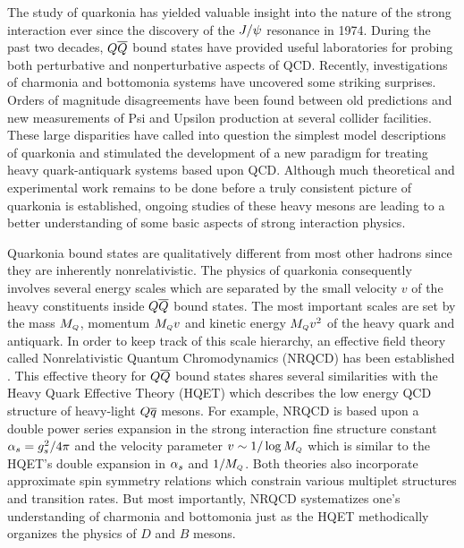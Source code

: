 

	The study of quarkonia has yielded valuable insight into the nature of 
the strong interaction ever since the discovery of the $J/\psi$ resonance in 
1974.   During the past two decades, $Q{\overline Q}$ bound states have provided 
useful laboratories for probing both perturbative and nonperturbative aspects 
of QCD.  Recently, investigations of charmonia and bottomonia systems have 
uncovered some striking surprises.  Orders of magnitude disagreements have 
been found between old predictions and new measurements of Psi and Upsilon 
production at several collider facilities.  These large disparities have 
called into question the simplest model descriptions of quarkonia and 
stimulated the development of a new paradigm for treating heavy 
quark-antiquark systems based upon QCD.  Although much theoretical and 
experimental work remains to be done before a truly consistent picture 
of quarkonia is established, ongoing studies of these heavy mesons are leading 
to a better understanding of some basic aspects of strong interaction physics. 

	Quarkonia bound states are qualitatively different from most 
other hadrons since they are inherently nonrelativistic.  The physics of 
quarkonia consequently involves several energy scales which are separated by 
the small velocity $v$ of the heavy constituents inside 
$Q{\overline Q}$ bound states.  The most important scales are set by the mass $M_{\scriptscriptstyle Q}$, 
momentum $M_{\scriptscriptstyle Q} v$ and kinetic energy $M_{\scriptscriptstyle Q} v^2$ of the heavy quark and 
antiquark.  In order to keep track of this scale hierarchy, an effective field 
theory called Nonrelativistic Quantum Chromodynamics (NRQCD) has been 
established \Bodwin.  This effective theory for $Q{\overline Q}$ bound states shares 
several similarities with the Heavy Quark Effective Theory (HQET) which 
describes the low energy QCD structure of heavy-light $Q{\overline q}$ mesons.  For 
example, NRQCD is based upon a double power series expansion in the strong 
interaction fine structure constant $\alpha_s = g_s^2 / 4\pi$ and the velocity 
parameter $v \sim 1/\log M_{\scriptscriptstyle Q}$ which is similar to the HQET's double expansion 
in $\alpha_s$ and $1/M_{\scriptscriptstyle Q}$.  Both theories also incorporate approximate spin symmetry 
relations which constrain various multiplet structures and transition rates.  
But most importantly, NRQCD systematizes one's understanding of charmonia and 
bottomonia just as the HQET methodically organizes the physics of $D$ 
and $B$ mesons. 

